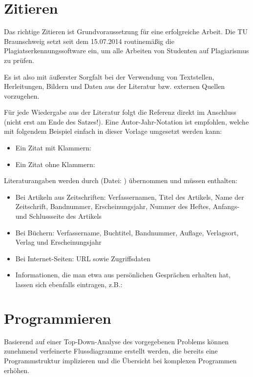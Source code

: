 \section{Zitieren}

Das richtige Zitieren ist Grundvoraussetzung für eine erfolgreiche Arbeit. Die TU Braunschweig setzt seit dem 15.07.2014 routinemäßig
die Plagiatserkennungssoftware  ein, um alle Arbeiten von Studenten auf Plagiarismus zu prüfen.

Es ist also mit äußerster Sorgfalt bei der Verwendung von Textstellen, Herleitungen, Bildern und Daten aus der Literatur
bzw. externen Quellen vorzugehen.

Für jede Wiedergabe aus der Literatur folgt die Referenz direkt im Anschluss (nicht erst am Ende des Satzes!). Eine Autor-Jahr-Notation ist 
empfohlen, welche mit folgendem Beispiel einfach in dieser Vorlage umgesetzt werden kann:
\begin{itemize}
 \item Ein Zitat mit Klammern: \citep{autor2012}
 \item Ein Zitat ohne Klammern: \cite{autor2012}
\end{itemize}

Literaturangaben werden durch  (Datei: ) übernommen und müssen enthalten:
\begin{itemize}
 \item Bei Artikeln aus Zeitschriften: Verfassernamen, Titel des Artikels, Name der Zeitschrift, Bandnummer, 
       Erscheinungsjahr, Nummer des Heftes, Anfangs- und Schlussseite des Artikels
 \item Bei Büchern: Verfassername, Buchtitel, Bandnummer, Auflage, Verlagsort, Verlag und Erscheinungsjahr     
 \item Bei Internet-Seiten: URL sowie Zugriffsdaten
 \item Informationen, die man etwa aus persönlichen Gesprächen erhalten hat, lassen sich ebenfalls eintragen, z.B.:
\end{itemize}

\section{Programmieren}

Basierend auf einer Top-Down-Analyse des vorgegebenen Problems können zunehmend verfeinerte 
Flussdiagramme erstellt werden, die bereits eine Programmstruktur implizieren und die Übersicht bei komplexen
Programmen erhöhen.

